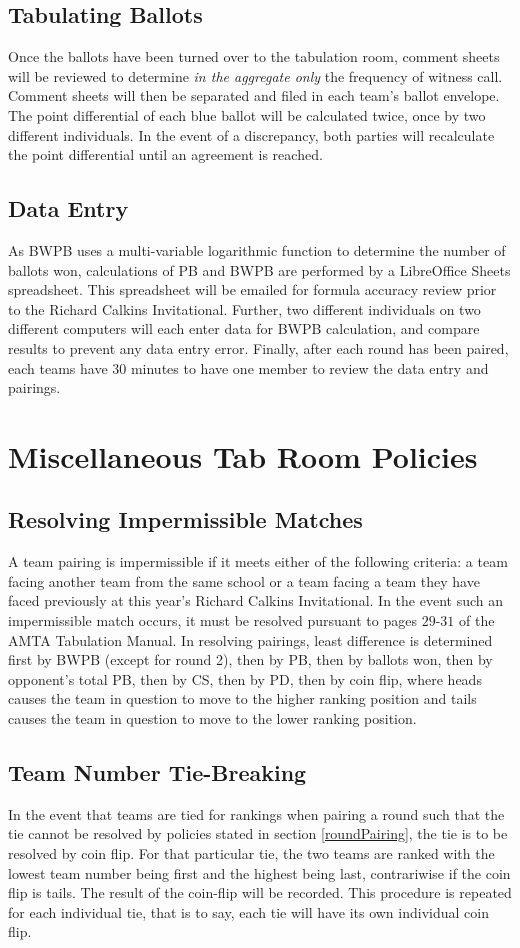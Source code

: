 \documentclass{article}
\begin{document}
\subsection{Tabulating Ballots}
Once the ballots have been turned over to the tabulation room, comment sheets will be reviewed to determine \textit{in the aggregate only} the frequency of witness call.  Comment sheets will then be separated and filed in each team's ballot envelope.  The point differential of each blue ballot will be calculated twice, once by two different individuals.  In the event of a discrepancy, both parties will recalculate the point differential until an agreement is reached.
\subsection{Data Entry}
As BWPB uses a multi-variable logarithmic function to determine the number of ballots won, calculations of PB and BWPB are performed by a LibreOffice Sheets spreadsheet.  This spreadsheet will be emailed for formula accuracy review prior to the Richard Calkins Invitational.  Further, two different individuals on two different computers will each enter data for BWPB calculation, and compare results to prevent any data entry error.  Finally, after each round has been paired, each teams have 30 minutes to have one member to review the data entry and pairings.
\section{Miscellaneous Tab Room Policies}
\subsection{Resolving Impermissible Matches}
\label{impermissible}
A team pairing is impermissible if it meets either of the following criteria:  a team facing another team from the same school or a team facing a team they have faced previously at this year's Richard Calkins Invitational.  In the event such an impermissible match occurs, it must be resolved pursuant to pages $29$-$31$ of the AMTA Tabulation Manual.  In resolving pairings, least difference is determined first by BWPB (except for round 2), then by PB, then by ballots won, then by opponent's total PB, then by CS, then by PD, then by coin flip, where heads causes the team in question to move to the higher ranking position and tails causes the team in question to move to the lower ranking position.
\subsection{Team Number Tie-Breaking}
\label{tiebreaking}
In the event that teams are tied for rankings when pairing a round such that the tie cannot be resolved by policies stated in section \ref{roundPairing}, the tie is to be resolved by coin flip.  For that particular tie, the two teams are ranked with the lowest team number being first and the highest being last, contrariwise if the coin flip is tails. The result of the coin-flip will be recorded. This procedure is repeated for each individual tie, that is to say, each tie will have its own individual coin flip.
\end{document}
